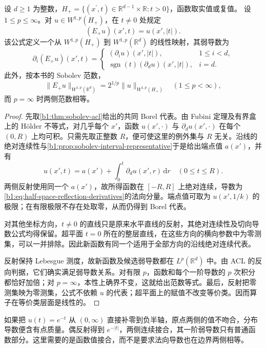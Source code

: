\begin{theorem}[半空间偶反射]\label{b1:thm:half-space-sobolev-extension}
设 \(d\geq1\) 为整数，\(H_+=\{(x^{\prime},t)\in\mathbb R^{d-1}\times\mathbb R:t>0\}\)，函数取实值或复值。
设 \(1\le p\le\infty\)。对 \(u\in W^{1,p}(H_+)\)，在 \(t\ne0\) 处规定
\[
 (E_+u)(x',t)=u(x',|t|).
\]
该公式定义一个从 \(W^{1,p}(H_+)\) 到 \(W^{1,p}(\mathbb R^d)\) 的线性映射，其弱导数为
\begin{equation}\label{b1:eq:half-space-reflection-derivatives}
 \partial_i(E_+u)(x',t)=
 \begin{cases}
  (\partial_i u)(x',|t|),&1\le i<d,\\
  \operatorname{sgn}(t)(\partial_d u)(x',|t|),&i=d.
 \end{cases}
\end{equation}
此外，按本书的 Sobolev 范数，
\[
 \|E_+u\|_{W^{1,p}(\mathbb R^d)}
 =2^{1/p}\|u\|_{W^{1,p}(H_+)}\quad(1\le p<\infty),
\]
而 \(p=\infty\) 时两侧范数相等。
\end{theorem}
\begin{proof}
先取\cref{b1:thm:sobolev-acl}给出的共同 Borel 代表。由 Fubini 定理及有界盒上的 Hölder 不等式，对几乎每个 \(x'\)，函数 \(u(x',\cdot)\) 与 \(\partial_d u(x',\cdot)\) 在每个 \((0,R)\) 上均可积。只需先取正整数 \(R\)，便可使这里的例外集与 \(R\) 无关。沿线的绝对连续性与\cref{b1:prop:sobolev-interval-representative}于是给出端点值 \(a(x')\)，并有
\[
 u(x',t)=a(x')+\int_0^t\partial_d u(x',r)\,\mathrm dr
 \quad(0\le t\le R).
\]
两侧反射使用同一个 \(a(x')\)，故所得函数在 \([-R,R]\) 上绝对连续，导数为\eqref{b1:eq:half-space-reflection-derivatives}的法向分量。端点值可取为 \(u(x',1/k)\) 的极限；在有限极限不存在处取零，从而仍得到 Borel 代表。

对其他坐标方向，\(t\ne0\) 的直线只是原来水平直线的反射，其绝对连续性及切向导数公式均得保留。超平面 \(t=0\) 所在的整层直线，在这些方向的横向参数中为零测集，可以一并排除。因此新函数有同一个适用于全部方向的沿线绝对连续代表。

反射保持 Lebesgue 测度，故新函数及候选弱导数都在 \(L^p(\mathbb R^d)\) 中。由 ACL 的反向判据，它们确实满足弱导数关系。对有限 \(p\)，函数和每个一阶导数的 \(p\) 次积分都恰好加倍；对 \(p=\infty\)，本性上确界不变，这就给出范数等式。最后，反射把零测集映为零测集，公式不依赖 \(u\) 的代表；超平面上的赋值不改变等价类。因而算子在等价类层面是线性的。
\end{proof}

如果把 \(u(t)=e^{-t}\) 从 \((0,\infty)\) 直接补零到负半轴，原点两侧的值不吻合，分布导数便含有点质量。偶反射得到 \(e^{-|t|}\)，两侧连续接合，其一阶弱导数只有普通函数部分。这里需要的是函数值接合，而不是要求法向导数也在边界两侧相等。

